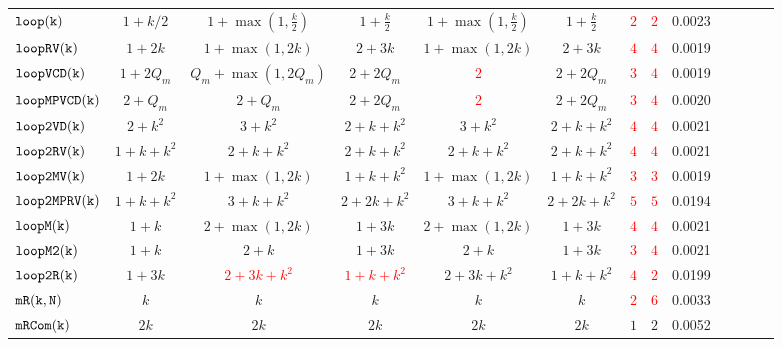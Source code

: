 {\begin {table}[t]
\begin{center}
{\begin{tabular}{ | >{\tiny}l | c | c | c | c | c | c | c | c | c | c | c |c}
         $  \mathtt{loop(k)}$ &  $1+k/2$ &    $1 + \max(1, \frac{k}{2}) $  &  $1+\frac{k}{2} $ & $1 + \max(1, \frac{k}{2}) $  &  $1+\frac{k}{2} $ & \textcolor{red}{$2$} & \textcolor{red}{$2$} & 0.0023 \\
         $  \mathtt{loopRV(k)}$  &  $1+2k$  &  $ 1 + \max(1,2k)$ & $2 + 3 k$  &  $ 1 + \max(1,2k)$ & $2 + 3 k$ & \textcolor{red}{$4$} & \textcolor{red}{$4$} & 0.0019 \\
         $  {\mathtt{loopVCD(k)}} $ &  ${1 + 2Q_m}$  &  ${Q_m+\max(1,2Q_m)}$  & $2+2Q_m$  & \textcolor{red}{$2$} & $2+2Q_m$ & \textcolor{red}{$3$} & \textcolor{red}{$4$} & 0.0019 \\
         $ {\mathtt{loopMPVCD(k)}}$ &  ${2 + Q_m}$  &  $2 + Q_m$  & $2+2Q_m$  & \textcolor{red}{$2$} & $2+2Q_m$ & \textcolor{red}{$3$} & \textcolor{red}{$4$} & 0.0020 \\
         $  \mathtt{loop2VD(k)}$ &  $2+k^2$  &   $3 + k^2$ & $2 + k + k^2$   &  $3 + k^2$ & $2 + k + k^2$  & \textcolor{red}{$4$} & \textcolor{red}{$4$} & 0.0021 \\
         $  \mathtt{loop2RV(k)}$ &  $1+k+k^2$  &  $ 2 + k +  k^2 $    &  $2 + k + k^2$   &  $ 2 + k +  k^2 $    &  $2 + k + k^2$ & \textcolor{red}{$4$} & \textcolor{red}{$4$} & 0.0021 \\
         $  \mathtt{loop2MV(k)}$ &  $1+2k$  & $1 + \max(1,2k) $ &  $1 + k + k^2$ & $1 + \max(1,2k) $ &  $1 + k + k^2$ & \textcolor{red}{$3$} & \textcolor{red}{$3$} & 0.0019 \\
         $ \mathtt{loop2MPRV(k)}$ &  $1+k+k^2$  &  $3 + k + k^2  $ &  $2 + 2k + k^2$  &  $3 + k + k^2  $ &  $2 + 2k + k^2$ & \textcolor{red}{$5$} &\textcolor{red}{$5$}  & 0.0194  \\
         {$ \mathtt{loopM(k)}$} &  $1+k$  &  $ 2 + \max(1,2k) $ & $1 + 3k  $  &   $ 2 + \max(1,2k) $ & $1 + 3k  $  & \textcolor{red}{$4$} & \textcolor{red}{$4$} & 0.0021 \\
         {$ \mathtt{loopM2(k)}$}&  $1+k$   &  $2 + k $ & $1 + 3k$  &  $2 + k $ & $1 + 3k$ & \textcolor{red}{$3$} & \textcolor{red}{$4$} & 0.0021 \\
         {$\mathtt{loop2R(k)}$} &  $1+3k$ &  \textcolor{red}{$2 + 3k + k^2$} &  \textcolor{red}{$1 + k + k^2$}  &  $2 + 3k + k^2$ &  $1 + k + k^2$ & \textcolor{red}{$4$} & \textcolor{red}{$2$} & 0.0199 \\
         $  \mathtt{mR(k, N)}$ &  $k$ & $ k   $ & $k $   &  $ k   $ & $k $ & \textcolor{red}{$2$} & \textcolor{red}{$6$} & 0.0033 \\
         $  \mathtt{mRCom(k)}$ &  $2k$  & $2k $ & $ 2k $   &  $  2k $ & $ 2k $ & $1$ & $2$ & 0.0052 \\

\end{tabular}}
\end{center}
\end{table}}
